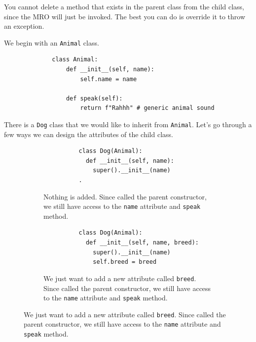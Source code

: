   \begin{theorem}
    \label{thm:deleting-method-belong-to-parent-in-child}
    You cannot delete a method that exists in the parent class from the child class, since the MRO will just be invoked. The best you can do is override it to throw an exception. 
  \end{theorem}

  \begin{example}
    \label{ex:modifying-attributes-in-child-class}
    We begin with an \texttt{Animal} class.

    \begin{figure}[H]
      \centering 
      \begin{lstlisting}
        class Animal: 
            def __init__(self, name):
                self.name = name
            
            def speak(self):
                return f"Rahhh" # generic animal sound
      \end{lstlisting} 
      \caption{} 
    \end{figure}

    There is a \texttt{Dog} class that we would like to inherit from \texttt{Animal}. Let's go through a few ways we can design the attributes of the child class. 

    \begin{figure}[H]
      \centering
      \begin{subfigure}[b]{0.48\textwidth}
        \centering
        \begin{lstlisting}
          class Dog(Animal): 
            def __init__(self, name): 
              super().__init__(name) 
          .
        \end{lstlisting}
        \caption{Nothing is added. Since called the parent constructor, we still have access to the \texttt{name} attribute and \texttt{speak} method. }
      \end{subfigure}
      \hfill 
      \begin{subfigure}[b]{0.48\textwidth}
        \centering
        \begin{lstlisting}
          class Dog(Animal): 
            def __init__(self, name, breed): 
              super().__init__(name)
              self.breed = breed
        \end{lstlisting}
        \caption{We just want to add a new attribute called \texttt{breed}. Since called the parent constructor, we still have access to the \texttt{name} attribute and \texttt{speak} method. }
      \end{subfigure}


\end{figure}
\end{example}
